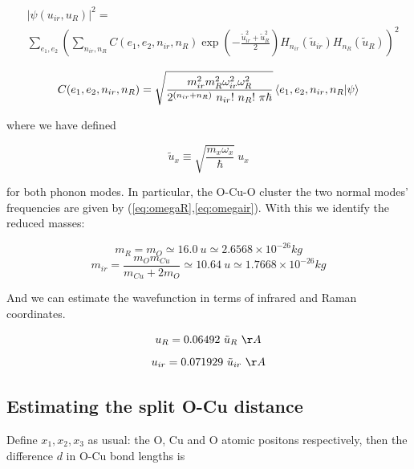 \begin{equation}\label{eq:phonon-coord-projection}
\begin{split} & |\psi(u_{ir}, u_R)|^2 = \\
& \sum_{e_1,e_2} \left(\sum_{n_{ir},n_R} C(e_1,e_2,n_{ir},n_{R})
\exp \left( - \frac{ \tilde{u}_{ir}^2 + \tilde{u}_R^2 }{2}\right) H_{n_{ir}} ( \tilde{u}_{ir}) H_{n_R}( \tilde{u}_R) \right)^2
\end{split}
\end{equation}

\begin{equation}
C(e_1,e_2,n_{ir},n_R) = \sqrt{\frac{ m_{ir}^2 m_R^2 \omega_{ir}^2 \omega_R^2 }{2^{(n_{ir} + n_R)}\ n_{ir}!\ n_R!\ \pi \hbar}} 
\braket{e_1, e_2, n_{ir}, n_R}{\psi} 
\end{equation}

where we have defined 

\begin{equation}\label{eq:uTildeDef}
\tilde{u}_x \equiv \sqrt{\frac{m_x\omega_x}{\hbar}}\ u_x
\end{equation}

for both phonon modes. In particular, the O-Cu-O cluster the two normal modes' frequencies are given by (\ref{eq:omegaR},\ref{eq:omegair}). With this we identify the reduced masses:

\begin{equation}\label{eq:redMassR}
m_R = m_O \simeq 16.0\ u \simeq 2.6568 \times 10^{-26} kg
\end{equation}
\begin{equation}\label{eq:redMassIr}
m_{ir}=\frac{m_Om_{Cu}}{m_{Cu}+2m_O} \simeq 10.64\ u \simeq 1.7668 \times 10^{-26}kg
\end{equation}

And we can estimate the wavefunction in terms of infrared and Raman coordinates.

\begin{equation}\label{eq:uRvstildeuR}
u_R = 0.06492\ \tilde{u}_R\ \AA
\end{equation}
\begin{equation}\label{eq:uirvstildeuir}
u_{ir} = 0.071929\ \tilde{u}_{ir}\ \AA
\end{equation}


\subsection{Estimating the split O-Cu distance}

Define $x_1,x_2,x_3$ as usual: the O, Cu and O atomic positons respectively, then the difference $d$ in O-Cu bond lengths is

